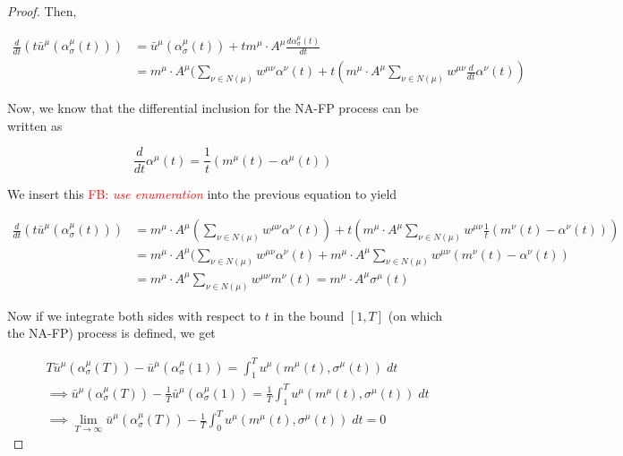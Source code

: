 \documentclass{article}
\theoremstyle{definition}
\newcommand{\fb}[1]{\textcolor{red}{FB: \textit{#1}}}
\begin{document}
\begin{proof}
    Then, 

    \begin{align}
      \frac{d}{dt} (t \bar{u}^\mu (\alpha_\sigma^\mu (t))) & =  \bar{u}^\mu (\alpha_\sigma^\mu (t)) + t m^\mu \cdot A^\mu \frac{d \alpha_\sigma^\mu (t)}{dt} \\
      & = m^\mu \cdot A^\mu (\sum_{\nu \in N(\mu)} w^{\mu \nu} \alpha^\nu (t) + t (m^\mu \cdot A^\mu \sum_{\nu \in N(\mu)} w^{\mu \nu} \frac{d}{dt} \alpha^\nu(t))
    \end{align} 

    Now, we know that the differential inclusion for the NA-FP process can be written as

    \begin{equation}
      \frac{d}{dt} \alpha^\mu (t) = \frac{1}{t} (m^\mu(t) - \alpha^\mu (t))
    \end{equation}

    We insert this \fb{use enumeration} into the previous equation to yield

    \begin{align}
      \frac{d}{dt} (t \bar{u}^\mu (\alpha_\sigma^\mu (t))) & = m^\mu \cdot A^\mu (\sum_{\nu \in N(\mu)} w^{\mu \nu} \alpha^\nu (t)) + t(m^\mu \cdot A^\mu \sum_{\nu \in N(\mu)} w^{\mu \nu} \frac{1}{t} (m^\nu(t) - \alpha^\nu (t))) \\
      & = m^\mu \cdot A^\mu (\sum_{\nu \in N(\mu)} w^{\mu \nu} \alpha^\nu (t) + m^\mu \cdot A^\mu \sum_{\nu \in N(\mu)} w^{\mu \nu} (m^\nu(t) - \alpha^\nu (t)) \\
      & = m^\mu \cdot A^\mu \sum_{\nu \in N(\mu)} w^{\mu \nu} m^\nu(t) = m^\mu \cdot A^\mu \sigma^\mu(t) 
    \end{align}


    Now if we integrate both sides with respect to $t$ in the bound $[1, T]$ (on which the NA-FP) process is defined, we get

    \begin{align}
      &  T \bar{u}^\mu (\alpha_\sigma^\mu (T)) - \bar{u}^\mu (\alpha_\sigma^\mu (1)) = \int_1^T u^\mu (m^\mu(t), \sigma^\mu(t)) \; dt \\
      & \implies \bar{u}^\mu (\alpha_\sigma^\mu (T)) - \frac{1}{T} \bar{u}^\mu (\alpha_\sigma^\mu (1)) = \frac{1}{T} \int_1^T u^\mu (m^\mu(t), \sigma^\mu(t)) \; dt \\
      & \implies \lim_{T \rightarrow \infty} \bar{u}^\mu (\alpha_\sigma^\mu (T)) - \frac{1}{T} \int_0^T u^\mu (m^\mu(t), \sigma^\mu(t)) \; dt = 0
    \end{align}


\end{proof}
\end{document}
